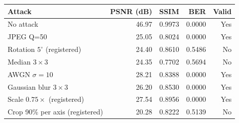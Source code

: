 \begin{tabular}{lrrrr}
\toprule
Attack & PSNR (dB) & SSIM & BER & Valid \\
\midrule
No attack & 46.97 & 0.9973 & 0.0000 & Yes \\
JPEG Q=50 & 25.05 & 0.8024 & 0.0000 & Yes \\
Rotation $5^\circ$ (registered) & 24.40 & 0.8610 & 0.5486 & No \\
Median $3\times3$ & 24.35 & 0.7702 & 0.5694 & No \\
AWGN $\sigma=10$ & 28.21 & 0.8388 & 0.0000 & Yes \\
Gaussian blur $3\times3$ & 26.20 & 0.8530 & 0.0000 & Yes \\
Scale $0.75\times$ (registered) & 27.54 & 0.8956 & 0.0000 & Yes \\
Crop 90\% per axis (registered) & 20.28 & 0.8222 & 0.5139 & No \\
\bottomrule
\end{tabular}
